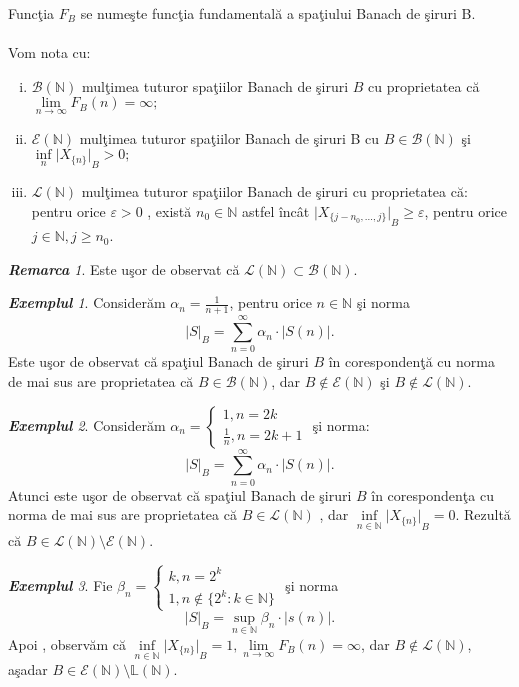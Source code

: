 \documentclass[ a4paper, 12pt]{report}
\theoremstyle{definition}
\theoremstyle{remark}
\newtheorem{remarc}{\bf Remarca}[section]
\newtheorem{exemple}{\bf Exemplul}[section]
\numberwithin{equation}{section}
\begin{document}
Func\c tia $F_B$ se nume\c ste func\c tia fundamental\u a a spa\c tiului Banach de \c siruri B.\\
\\Vom nota cu:
\begin{enumerate}[(i)]
\item $\mathcal{B}(\mathbb{N})$ mul\c timea tuturor spa\c tiilor Banach de \c siruri $B$ cu proprietatea c\u a $\lim\limits_{n \rightarrow \infty} F_B(n)=\infty;$
\item $\mathcal{E}(\mathbb{N})$ mul\c timea tuturor spa\c tiilor Banach de \c siruri B cu $B \in \mathcal{B}(\mathbb{N})$ \c si $\inf\limits_{n}{\lvert X_{\{n\}} \rvert}_B>0;$
\item $\mathcal{L}(\mathbb{N})$ mul\c timea tuturor spa\c tiilor Banach de \c siruri cu proprietatea c\u a:
pentru orice $\varepsilon>0$ , exist\u a $n_0 \in \mathbb{N}$ astfel \^inc\^at ${\lvert X_{\{j-n_0,...,j\}} \rvert}_B \geq \varepsilon $, pentru orice $j \in \mathbb{N} , j \geq n_0$.
\end{enumerate}
\begin{remarc}\label{rer}
Este u\c sor de observat c\u a $\mathcal{L}(\mathbb{N})\subset \mathcal{B}(\mathbb{N})$.
\end{remarc}
\begin{exemple}
Consider\u am $\alpha_n=\frac{1}{n+1}$, pentru orice $n \in \mathbb{N}$ \c si norma
\[{\lvert S \rvert}_B=\sum\limits_{n=0}^{\infty}{\alpha_n \cdot \lvert S(n) \rvert}.\]
Este u\c sor de observat c\u a spa\c tiul Banach de \c siruri $B$ \^in coresponden\c t\u a cu norma de mai sus are proprietatea c\u a $B \in \mathcal{B}(\mathbb{N})$, dar $B \notin \mathcal{E}(\mathbb{N})$ \c si $B \notin \mathcal{L}(\mathbb{N})$.
\end{exemple}
\begin{exemple}
Consider\u am $\alpha_n=
\begin{cases}
1,n=2k\\
\frac{1}{n},n=2k+1
\end{cases}$ \c si norma:\\
\[{\lvert S \rvert}_B=\sum\limits_{n=0}^{\infty}{\alpha_n \cdot \lvert S(n) \rvert}.\]
 Atunci este u\c sor de observat c\u a spa\c tiul Banach de \c siruri $B$ \^in coresponden\c ta cu norma de mai sus are proprietatea c\u a $B \in \mathcal{L}(\mathbb{N})$ , dar $\inf\limits_{n \in \mathbb{N}}{{\lvert X_{\{n\}} \rvert}_B}=0$. Rezult\u a c\u a $B \in \mathcal{L}(\mathbb{N}) \setminus \mathcal{E}(\mathbb{N})$.
\end{exemple}
\begin{exemple}
Fie $\beta_n=
\begin{cases}
k,n=2^k\\
1,n \notin \{2^k:k \in \mathbb{N}\}
\end{cases}$ \c si norma
\[{\lvert S \rvert}_B=\sup\limits_{n \in \mathbb{N}}{\beta_n \cdot \lvert s(n) \rvert}.\]
Apoi , observ\u am c\u a $\inf\limits_{n \in \mathbb{N}}{\lvert X_{\{n\}}\rvert}_B=1,\lim\limits_{n \rightarrow \infty} F_B(n)=\infty$, dar $B \notin \mathcal{L}(\mathbb{N})$, a\c sadar $B \in \mathcal{E}(\mathbb{N}) \setminus \mathbb{L}(\mathbb{N})$.
\end{exemple}
\end{document}

